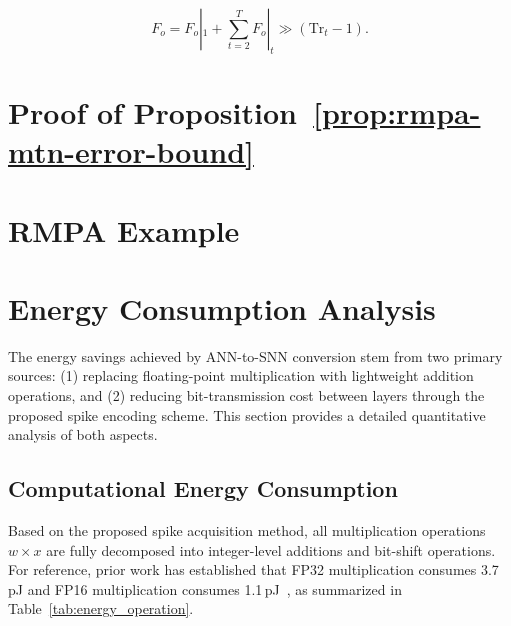 \begin{movedblock}
\begin{equation}\label{eq:temporal_accum}
F_o = F_{o}|_1 + \sum_{t=2}^{T} F_{o}|_t \gg (\mathrm{Tr}_t - 1).
\end{equation}
\end{movedblock}

\section{Proof of Proposition~\ref{prop:rmpa-mtn-error-bound}}
\label{sec:error}

\section{RMPA Example}
\label{sec:rmpa_example}

\section{Energy Consumption Analysis\label{sec:energy}}

The energy savings achieved by ANN-to-SNN conversion stem from two primary sources: (1) replacing floating-point multiplication with lightweight addition operations, and (2) reducing bit-transmission cost between layers through the proposed spike encoding scheme. This section provides a detailed quantitative analysis of both aspects.

\subsection{Computational Energy Consumption}

Based on the proposed spike acquisition method, all multiplication operations $w \times x$ are fully decomposed into integer-level additions and bit-shift operations. For reference, prior work has established that FP32 multiplication consumes 3.7\,pJ and FP16 multiplication consumes 1.1\,pJ~\cite{energy}, as summarized in Table~\ref{tab:energy_operation}.


